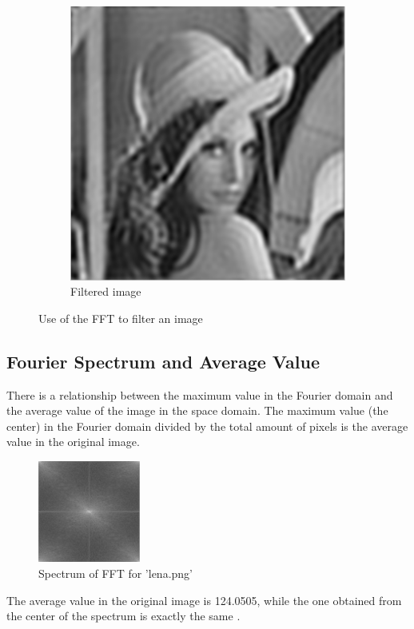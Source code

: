 \documentclass[a4paper, 10pt, conference] {article}
\begin{document}
\begin{figure}[H]
 	\begin{subfigure}{0.32\textwidth}
 		\centering
 		\includegraphics[scale=0.336]{reportImages/lena_FFT.PNG}
 		\caption{Filtered image}
 	\end{subfigure}
 	\caption{Use of the FFT to filter an image}
 	\label{exp2_FFT}
 \end{figure} 
 
 \subsection{Fourier Spectrum and Average Value}
 There is a relationship between the maximum value in the Fourier domain and the average value of the image in the space domain. The maximum value (the center) in the Fourier domain divided by the total amount of pixels is the average value in the original image.
 \begin{figure}[H]
 	\centering
 	\includegraphics[width=0.3\textwidth]{reportImages/exp2_3_spectrum.png} %
 	\caption{Spectrum of FFT for 'lena.png'}
 	\label{Average}
 \end{figure}
 The average value in the original image is 124.0505, while the one obtained from the center of the spectrum is exactly the same .
 
\end{document}
